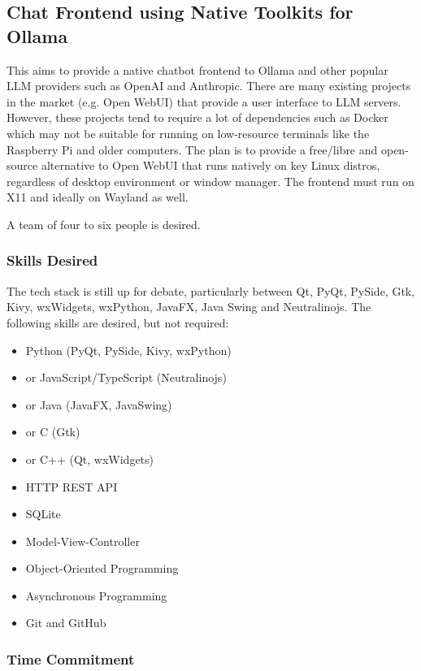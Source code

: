 \subsection{Chat Frontend using Native Toolkits for Ollama}

This aims to provide a native chatbot frontend to Ollama and other popular LLM providers such as OpenAI and Anthropic.  There are many existing projects in the market (e.g. Open WebUI) that provide a user interface to LLM servers.  However, these projects tend to require a lot of dependencies such as Docker which may not be suitable for running on low-resource terminals like the Raspberry Pi and older computers.  The plan is to provide a free/libre and open-source alternative to Open WebUI that runs natively on key Linux distros, regardless of desktop environment or window manager.  The frontend must run on X11 and ideally on Wayland as well.

A team of four to six people is desired.

\subsubsection*{Skills Desired}

The tech stack is still up for debate, particularly between Qt, PyQt, PySide, Gtk, Kivy, wxWidgets, wxPython, JavaFX, Java Swing and Neutralinojs.  The following skills are desired, but not required:

\begin{multicols}{2}
\begin{itemize}
    \item Python (PyQt, PySide, Kivy, wxPython)
    \item or JavaScript/TypeScript (Neutralinojs)
    \item or Java (JavaFX, JavaSwing)
    \item or C (Gtk)
    \item or C++ (Qt, wxWidgets)
    \item HTTP REST API
    \item SQLite
    \item Model-View-Controller
    \item Object-Oriented Programming
    \item Asynchronous Programming
    \item Git and GitHub
\end{itemize}
\end{multicols}

\subsubsection*{Time Commitment}

